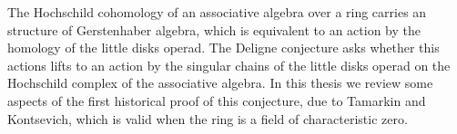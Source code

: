 \documentclass[TFM.tex]{subfiles}
\begin{document}


The Hochschild cohomology of an associative algebra over a ring carries an structure of Gerstenhaber algebra, which is equivalent to an action by the homology of the little disks operad. The Deligne conjecture asks whether this actions lifts to an action by the singular chains of the little disks operad on the Hochschild complex of the associative algebra. In this thesis we review some aspects of the first historical proof of this conjecture, due to Tamarkin and Kontsevich, which is valid when the ring is a field of characteristic zero. 
\end{document}
